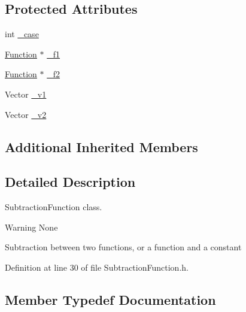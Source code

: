 \subsection*{Protected Attributes}
\begin{DoxyCompactItemize}
\item 
int \hyperlink{classocra_1_1SubtractionFunction_a2acdf28df1d3018d7c25cb8b16c879d1}{\+\_\+case}
\item 
\hyperlink{classocra_1_1Function}{Function} $\ast$ \hyperlink{classocra_1_1SubtractionFunction_a9adc6a235a48bdf90fe1ad4d4a18b7a0}{\+\_\+f1}
\item 
\hyperlink{classocra_1_1Function}{Function} $\ast$ \hyperlink{classocra_1_1SubtractionFunction_a22e626b681ffd6b9dd90ec4189ad431c}{\+\_\+f2}
\item 
Vector \hyperlink{classocra_1_1SubtractionFunction_a802ca5db967765779131701423f1b207}{\+\_\+v1}
\item 
Vector \hyperlink{classocra_1_1SubtractionFunction_a10736fb0de7f83a54a09055251cf4ad5}{\+\_\+v2}
\end{DoxyCompactItemize}
\subsection*{Additional Inherited Members}


\subsection{Detailed Description}
Subtraction\+Function class. 

\begin{DoxyWarning}{Warning}
None
\end{DoxyWarning}
Subtraction between two functions, or a function and a constant 

Definition at line 30 of file Subtraction\+Function.\+h.



\subsection{Member Typedef Documentation}
\hypertarget{classocra_1_1SubtractionFunction_a371966d5def8140a019099fc4346f413}{}\label{classocra_1_1SubtractionFunction_a371966d5def8140a019099fc4346f413} 
